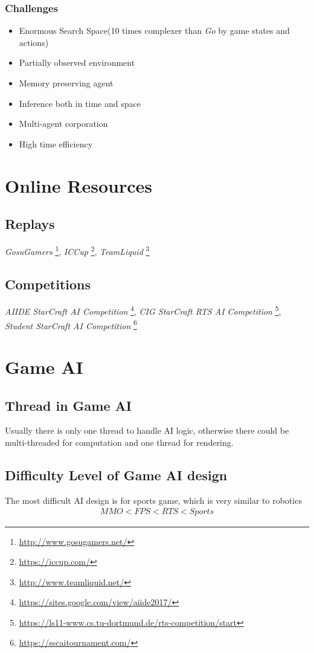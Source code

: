 \documentclass[sigconf]{acmart}
\begin{document}
\subsubsection{Challenges}
\begin{itemize}
\item Enormous Search Space(10 times complexer than \emph{Go} by game states and actions)
\item Partially observed environment
\item Memory preserving agent
\item Inference both in time and space
\item Multi-agent corporation
\item High time efficiency
\end{itemize}

\section{Online Resources}
\subsection{Replays}
\emph{GosuGamers}
\footnote{\url{http://www.gosugamers.net/}},
\emph{ICCup}
\footnote{\url{https://iccup.com/}},
\emph{TeamLiquid}
\footnote{\url{http://www.teamliquid.net/}}
\subsection{Competitions}
\emph{AIIDE StarCraft AI Competition}
\footnote{\url{https://sites.google.com/view/aiide2017/}},
\emph{CIG StarCraft RTS AI Competition}
\footnote{\url{https://ls11-www.cs.tu-dortmund.de/rts-competition/start}},
\emph{Student StarCraft AI Competition}
\footnote{\url{https://sscaitournament.com/}}

\section{Game AI}
\subsection{Thread in Game AI}
Usually there is only one thread to handle AI logic, otherwise there could be multi-threaded for computation and one thread for rendering.
\subsection{Difficulty Level of Game AI design}
The most difficult AI design is for sports game, which is very similar to robotics
\begin{eqnarray}
MMO<FPS<RTS<Sports
\end{eqnarray}
\end{document}
